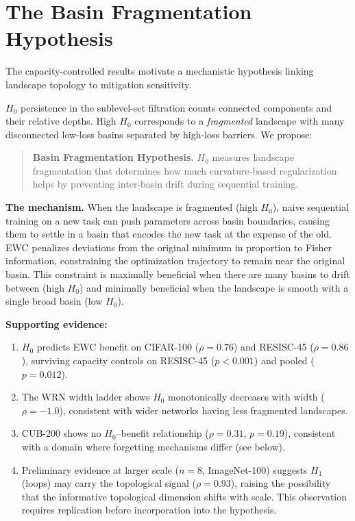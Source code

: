 \documentclass{article}
\begin{document}
\section{The Basin Fragmentation Hypothesis}
\label{sec:hypothesis}

The capacity-controlled results motivate a mechanistic hypothesis linking landscape topology to mitigation sensitivity.

$H_0$ persistence in the sublevel-set filtration counts connected components and their relative depths. High $H_0$ corresponds to a \emph{fragmented} landscape with many disconnected low-loss basins separated by high-loss barriers. We propose:

\begin{quote}
\textbf{Basin Fragmentation Hypothesis.} $H_0$ measures landscape fragmentation that determines how much curvature-based regularization helps by preventing inter-basin drift during sequential training.
\end{quote}

\textbf{The mechanism.} When the landscape is fragmented (high $H_0$), naive sequential training on a new task can push parameters across basin boundaries, causing them to settle in a basin that encodes the new task at the expense of the old. EWC penalizes deviations from the original minimum in proportion to Fisher information, constraining the optimization trajectory to remain near the original basin. This constraint is maximally beneficial when there are many basins to drift between (high $H_0$) and minimally beneficial when the landscape is smooth with a single broad basin (low $H_0$).

\textbf{Supporting evidence:}
\begin{enumerate}[nosep,leftmargin=*]
    \item $H_0$ predicts EWC benefit on CIFAR-100 ($\rho = 0.76$) and RESISC-45 ($\rho = 0.86$), surviving capacity controls on RESISC-45 ($p < 0.001$) and pooled ($p = 0.012$).
    \item The WRN width ladder shows $H_0$ monotonically decreases with width ($\rho = -1.0$), consistent with wider networks having less fragmented landscapes.
    \item CUB-200 shows no $H_0$--benefit relationship ($\rho = 0.31$, $p = 0.19$), consistent with a domain where forgetting mechanisms differ (see below).
    \item Preliminary evidence at larger scale ($n = 8$, ImageNet-100) suggests $H_1$ (loops) may carry the topological signal ($\rho = 0.93$), raising the possibility that the informative topological dimension shifts with scale. This observation requires replication before incorporation into the hypothesis.
\end{enumerate}
\end{document}

